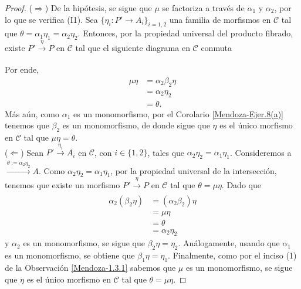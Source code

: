 \documentclass[tesis]{subfiles}
\begin{document}
\begin{proof}

    ($\Rightarrow$) De la hipótesis, se sigue que $\mu$ se factoriza a través de $\alpha_1$ y $\alpha_2$, por lo que se verifica (I1). Sea $\{\eta_i:P'\to A_i\}_{i=1,2}$ una familia de morfismos en $\mathscr{C}$ tal que $\theta = \alpha_1\eta_1 = \alpha_2\eta_2$. Entonces, por la propiedad universal del producto fibrado, existe $P'\xrightarrow[]{\eta}P$ en $\mathscr{C}$ tal que el siguiente diagrama en $\mathscr{C}$ conmuta
    \begin{center}
    \end{center}
    Por ende,
    \begin{align*}
        \mu\eta &= \alpha_2\beta_2\eta \\
                &= \alpha_2\eta_2 \\
                &= \theta.
    \end{align*}
    Más aún, como $\alpha_1$ es un monomorfismo, por el Corolario \ref{Mendoza-Ejer.8(a)} tenemos que $\beta_2$ es un monomorfismo, de donde sigue que $\eta$ es el único morfismo en $\mathscr{C}$ tal que $\mu\eta=\theta$. \\

    ($\Leftarrow$) Sean $P'\xrightarrow[]{\eta_i}A_i$ en $\mathscr{C}$, con $i\in\{1,2\}$, tales que $\alpha_2\eta_2 = \alpha_1\eta_1$. Consideremos a $\xrightarrow{\theta:=\alpha_2\eta_2}A$. Como $\alpha_2\eta_2 = \alpha_1\eta_1$, por la propiedad universal de la intersección, tenemos que existe un morfismo $P'\xrightarrow[]{\eta}P$ en $\mathscr{C}$ tal que $\theta = \mu\eta$. Dado que
    \begin{align*}
        \alpha_2(\beta_2\eta) &= (\alpha_2\beta_2)\eta \\
                              &= \mu\eta \\
                              &= \theta \\
                              &= \alpha_2\eta_2
    \end{align*}
    y $\alpha_2$ es un monomorfismo, se sigue que $\beta_2\eta = \eta_2$. Análogamente, usando que $\alpha_1$ es un monomorfismo, se obtiene que $\beta_1\eta = \eta_1$. Finalmente, como por el inciso (1) de la Observación \ref{Mendoza-1.3.1} sabemos que $\mu$ es un monomorfismo, se sigue que $\eta$ es el único morfismo en $\mathscr{C}$ tal que $\theta=\mu\eta$.
\end{proof}
\end{document}
